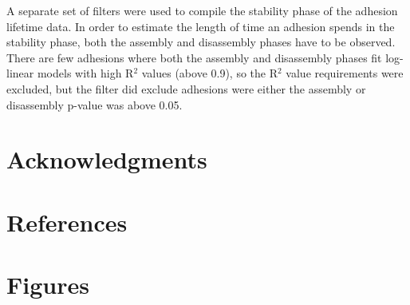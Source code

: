 \documentclass[10pt]{article}
\begin{document}
A separate set of filters were used to compile the stability phase of the
adhesion lifetime data. In order to estimate the length of time an adhesion
spends in the stability phase, both the assembly and disassembly phases have to
be observed. There are few adhesions where both the assembly and disassembly
phases fit log-linear models with high R$^2$ values (above 0.9), so the
R$^2$ value requirements were excluded, but the filter did exclude adhesions
were either the assembly or disassembly p-value was above 0.05.

\section*{Acknowledgments}

\section*{References}


\section*{Figures}


\end{document}
